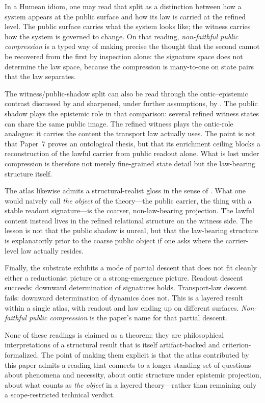 \documentclass[11pt]{article}
\theoremstyle{definition}
\begin{document}
In a Humean idiom, one may read that split as a distinction between how a
system appears at the public surface and how its law is carried at the refined
level. The public surface carries what the system looks like; the witness
carries how the system is governed to change. On that reading,
\emph{non-faithful public compression} is a typed way of making precise the
thought that the second cannot be recovered from the first by inspection alone:
the signature space does not determine the law space, because the compression is
many-to-one on state pairs that the law separates.

The witness/public-shadow split can also be read through the ontic--epistemic
contrast discussed by \citet{HarriganSpekkens2010} and sharpened, under further
assumptions, by \citet{PuseyBarrettRudolph2012}. The public shadow plays the
epistemic role in that comparison: several refined witness states can share the
same public image. The refined witness plays the ontic-role analogue: it
carries the content the transport law actually uses. The point is not that
Paper~7 proves an ontological thesis, but that its enrichment ceiling blocks a
reconstruction of the lawful carrier from public readout alone. What is lost
under compression is therefore not merely fine-grained state detail but the
law-bearing structure itself.

The atlas likewise admits a structural-realist gloss in the sense of
\citet{FrenchLadyman2003}. What one would naively call \emph{the object} of the
theory---the public carrier, the thing with a stable readout signature---is the
coarser, non-law-bearing projection. The lawful content instead lives in the
refined relational structure on the witness side. The lesson is not that the
public shadow is unreal, but that the law-bearing structure is explanatorily
prior to the coarse public object if one asks where the carrier-level law
actually resides.

Finally, the substrate exhibits a mode of partial descent that does not fit
cleanly either a reductionist picture or a strong-emergence picture. Readout
descent succeeds: downward determination of signatures holds. Transport-law
descent fails: downward determination of dynamics does not. This is a layered
result within a single atlas, with readout and law ending up on different
surfaces. \emph{Non-faithful public compression} is the paper's name for that
partial descent.

None of these readings is claimed as a theorem; they are philosophical
interpretations of a structural result that is itself artifact-backed and
criterion-formalized. The point of making them explicit is that the atlas
contributed by this paper admits a reading that connects to a longer-standing
set of questions---about phenomena and necessity, about ontic structure
under epistemic projection, about what counts as \emph{the object} in a
layered theory---rather than remaining only a scope-restricted technical
verdict.
\end{document}
